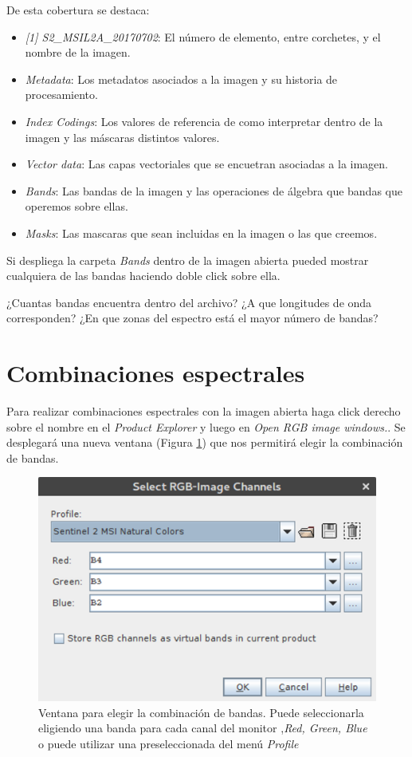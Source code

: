 \documentclass[a4paper,10pt]{book}
\begin{document}
De esta cobertura se destaca:

\begin{itemize}
    \item \emph{[1] S2\_MSIL2A\_20170702}: El número de elemento, entre corchetes, y el nombre de la imagen.
    \item \emph{Metadata}: Los metadatos asociados a la imagen y su historia de procesamiento.
    \item \emph{Index Codings}: Los valores de referencia de como interpretar dentro de la imagen y las máscaras distintos valores.
    \item \emph{Vector data}: Las capas vectoriales que se encuetran asociadas a la imagen.
    \item \emph{Bands}: Las bandas de la imagen y las operaciones de álgebra que bandas que operemos sobre ellas.
    \item \emph{Masks}: Las mascaras que sean incluidas en la imagen o las que creemos.
\end{itemize}

Si despliega la carpeta \emph{Bands} dentro de la imagen abierta pueded mostrar cualquiera de las bandas haciendo doble click sobre ella.

\begin{que}
    ¿Cuantas bandas encuentra dentro del archivo? ¿A que longitudes de onda corresponden? ¿En que zonas del espectro está el mayor número de bandas?
\end{que}

\section{Combinaciones espectrales}

Para realizar combinaciones espectrales con la imagen abierta haga click derecho sobre el nombre en el \emph{Product Explorer} y luego en \emph{Open RGB image windows.}. Se desplegará una nueva ventana (Figura \ref{fig:RGB}) que nos permitirá elegir la combinación de bandas.

\begin{figure}[h!]
    \centering
    \includegraphics[scale=0.7]{fig:RGB.png}
    \caption{Ventana para elegir la combinación de bandas. Puede seleccionarla eligiendo una banda para cada canal del monitor ,\emph{Red, Green, Blue} o puede utilizar una preseleccionada del menú \emph{Profile}}
    \label{fig:RGB}
\end{figure}
\end{document}
